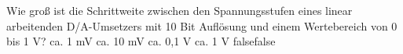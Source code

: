     {Wie groß ist die Schrittweite zwischen den Spannungsstufen eines linear arbeitenden D/A-Umsetzers mit 10 Bit Auflösung und einem Wertebereich von 0 bis 1 V?}
    {ca. 1 mV}
    {ca. 10 mV}
    {ca. 0,1 V}
    {ca. 1 V}
    {false}{false}